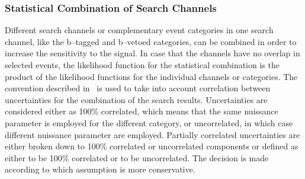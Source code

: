 \subsubsection{Statistical Combination of Search Channels}
Different search channels or complementary event categories in one search channel, like the b–tagged and b–vetoed categories, 
can be combined in order to increase the
sensitivity to the signal. In case that the channels have no overlap in selected events, the
likelihood function for the statistical combination is the product of the likelihood
functions for the individual channels or categories. The  convention described in~\cite{lhclimits} is used
to take into account correlation between uncertainties for the combination of the search results.
Uncertainties are considered either as 100\% correlated, which means that the same nuissance parameter
is employed for the different category,  or uncorrelated, in which case different nuissance parameter are
employed. Partially correlated uncertainties are either broken down to 100\% correlated or uncorrelated components or
defined as either to be 100\% correlated or to be uncorrelated. The decision is made according to which 
assumption is more conservative. 

